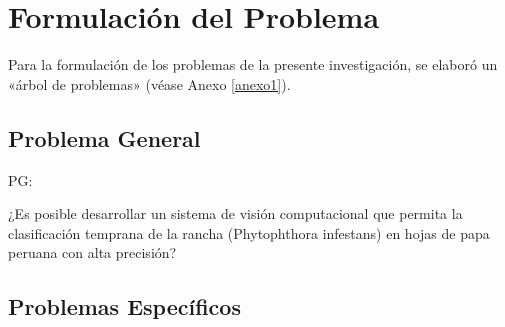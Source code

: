 

\section{Formulación del Problema}
Para la formulación de los problemas de la presente investigación, se elaboró un «árbol de problemas» (véase Anexo \ref{anexo1}).

\subsection{Problema General}
PG: \newcommand{\ProblemaGeneral}{
	¿Es posible desarrollar un sistema de visión computacional que permita la clasificación temprana de la rancha (Phytophthora infestans) en hojas de papa peruana con alta precisión?
}
\ProblemaGeneral

\subsection{Problemas Específicos}
\newcommand{\Pbone}{
	¿Cómo podemos desarrollar un sistema de clasificación automática de "Rancha" Phytophthora infestans en las hojas de papa peruana que sea preciso, eficiente y robusto a la variabilidad de las lesiones y las condiciones ambientales?
	
}

\newcommand{\Pbtwo}{
¿Cómo obtener un conjunto de datos representativo y diverso de imágenes de hojas de papa que abarque diferentes variedades, etapas de crecimiento, condiciones ambientales y niveles de severidad de la Rancha?
}

\newcommand{\Pbthree}{
 ¿Cómo desarrollar un método de segmentación preciso que permita separar las manchas de Rancha de otros elementos presentes en las hojas de papa, como venas y áreas sanas?
}

\newcommand{\Pbfour}{
¿Cómo reducir el tiempo de procesamiento requerido para analizar grandes volúmenes de imágenes de hojas de papa y proporcionar resultados de detección y clasificación en tiempo real o con una rápida respuesta?
}


